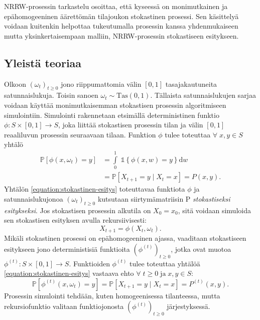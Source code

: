 \documentclass[finnish, 12pt, a4paper, sci, utf8, pdfa]{aaltothesis}
\newcommand{\indicator}{\mathopen{\mathds{1}}}
\newcommand*{\prob}{\mathbb{P}}
\begin{document}
NRRW-prosessin tarkastelu osoittaa, että kyseessä on monimutkainen ja epähomogeeninen äärettömän tilajoukon stokastinen prosessi. Sen käsittelyä voidaan kuitenkin helpottaa tukeutumalla
prosessin kanssa yhdenmukaiseen mutta yksinkertaisempaan malliin, NRRW-prosessin stokastiseen esitykseen.

\subsection{Yleistä teoriaa}

Olkoon \( (\omega_{t})_{t \geq 0} \) jono riippumattomia välin \( [0, 1] \) tasajakautuneita satunnaislukuja. Toisin sanoen \( \omega_{t} \sim \text{Tas}(0, 1) \). Tällaista satunnaislukujen sarjaa voidaan käyttää monimutkaisemman stokastisen prosessin algoritmiseen simulointiin. Simulointi rakennetaan etsimällä deterministinen funktio \( \phi : S \times [0, 1] \to S \), joka liittää stokastisen prosessin tilan ja välin \( [0, 1] \) reaaliluvun prosessin seuraavaan tilaan. Funktion \( \phi \) tulee toteuttaa $ \forall \; x, y \in S $ yhtälö
\begin{equation}
   \begin{aligned}
   \prob \left[ \phi(x, \omega_{t}) = y \right] &= \int\limits_0^1 \; \indicator \left\{ \phi(x, w) = y \right\} \mathrm{d}w \\
                                                &= \prob \left[ X_{t+1} = y \mid X_{t} = x \right] = P(x, y).
   \end{aligned}
   \label{equation:stokastinen-esitys}
\end{equation}
Yhtälön \ref{equation:stokastinen-esitys} toteuttavaa funktiota \( \phi \) ja satunnaislukujonoa \( (\omega_{t})_{t \geq 0} \) kutsutaan siirtymämatriisin P \textit{stokastiseksi esitykseksi}. Jos stokastisen prosessin alkutila on \( X_{0} = x_{0} \), sitä voidaan simuloida sen stokastisen esityksen avulla rekursiivisesti:
\[
   X_{t+1} = \phi(X_{t}, \omega_{t}).
\]
Mikäli stokastinen prosessi on epähomogeeninen ajassa, vaaditaan stokastiseen esitykseen jono deterministisiä funktioita \( (\phi^{(t)})_{t \geq 0} \), jotka ovat muotoa \( \phi^{(t)} : S \times [0, 1] \to S \). Funktioiden \( \phi^{(t)} \) tulee toteuttaa yhtälöä \ref{equation:stokastinen-esitys} vastaava ehto \( \forall \; t \geq 0 \; \text{ja} \; x, y \in S \):
\begin{equation}
   \prob \left[ \phi^{(t)}(x, \omega_{t}) = y \right] = \prob \left[ X_{t+1} = y \mid X_{t} = x \right] = P^{(t)}(x,y).
   \label{equation:epahom-stokastinen-esitys}
\end{equation}
Prosessin simulointi tehdään, kuten homogeenisessa tilanteessa, mutta rekursiofunktio valitaan funktiojonosta \( (\phi^{(t)})_{t \geq 0} \) järjestyksessä. \cite{Haggstrom}
\end{document}
